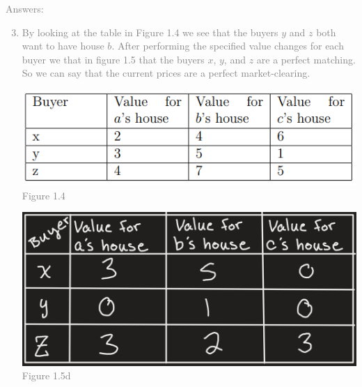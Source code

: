 \documentclass[11pt]{article}
\begin{document}
\textcolor{gray}{
Answers:
\begin{enumerate}
	\setcounter{enumi}{2}
	\item By looking at the table in Figure 1.4 we see that the buyers $y$ and $z$ both want to have house $b$.  After performing the specified value changes for each buyer we that in figure 1.5 that the buyers $x$, $y$, and $z$ are a perfect matching.  So we can say that the current prices are a perfect market-clearing.
	\begin{center}
		\includegraphics[scale=1.5]{Figure1.4}\\
		Figure 1.4
	\end{center} 
	\begin{center}
		\includegraphics[scale=0.3]{Figure1.5}\\
		Figure 1.5d
	\end{center}
\end{enumerate}
}
\end{document}
